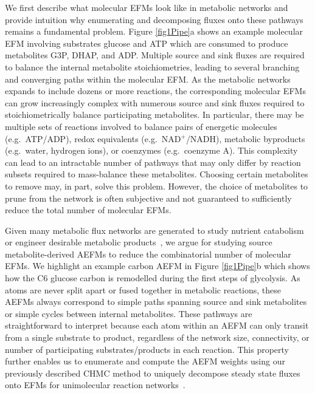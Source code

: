 \documentclass[12pt]{article}
\begin{document}
We first describe what molecular EFMs look like in metabolic networks and
provide intuition why enumerating and decomposing fluxes onto these
pathways remains a fundamental problem. Figure \ref{fig1Pipe}a shows an
example molecular EFM involving substrates glucose and ATP which are
consumed to produce metabolites G3P, DHAP, and ADP. Multiple source and
sink fluxes are required to balance the internal metabolite
stoichiometries, leading to several branching and converging paths within
the molecular EFM. As the metabolic networks expands to include dozens or
more reactions, the corresponding molecular EFMs can grow increasingly
complex with numerous source and sink fluxes required to
stoichiometrically balance participating metabolites. In particular, there
may be multiple sets of reactions involved to balance pairs of energetic
molecules (e.g.\ ATP/ADP), redox equivalents (e.g.\ NAD$^+$/NADH), metabolic
byproducts (e.g.\ water, hydrogen ions), or coenzymes (e.g.\ coenzyme A).
This complexity can lead to an intractable number of pathways that may
only differ by reaction subsets required to mass-balance these
metabolites. Choosing certain metabolites to remove may, in part, solve
this problem. However, the choice of metabolites to prune from the network
is often subjective and not guaranteed to sufficiently reduce the total
number of molecular EFMs.

Given many metabolic flux networks are generated to study nutrient
catabolism~\citep{ZamboniNicola2015DtMS} or engineer desirable metabolic
products~\citep{ZanghelliniJurgen2013Efmi}, we argue for studying source
metabolite-derived AEFMs to reduce the combinatorial number of molecular
EFMs. We highlight an example carbon AEFM in Figure \ref{fig1Pipe}b which
shows how the C6 glucose carbon is remodelled during the first steps of
glycolysis. As atoms are never split apart or fused together in metabolic
reactions, these AEFMs always correspond to simple paths spanning source
and sink metabolites or simple cycles between internal metabolites. These
pathways are straightforward to interpret because each atom within an AEFM
can only transit from a single substrate to product, regardless of the
network size, connectivity, or number of participating substrates/products
in each reaction. This property further enables us to enumerate and
compute the AEFM weights using our previously described CHMC method to
uniquely decompose steady state fluxes onto EFMs for unimolecular reaction
networks~\citep{ChitpinJustinG2023AMct}.
\end{document}

